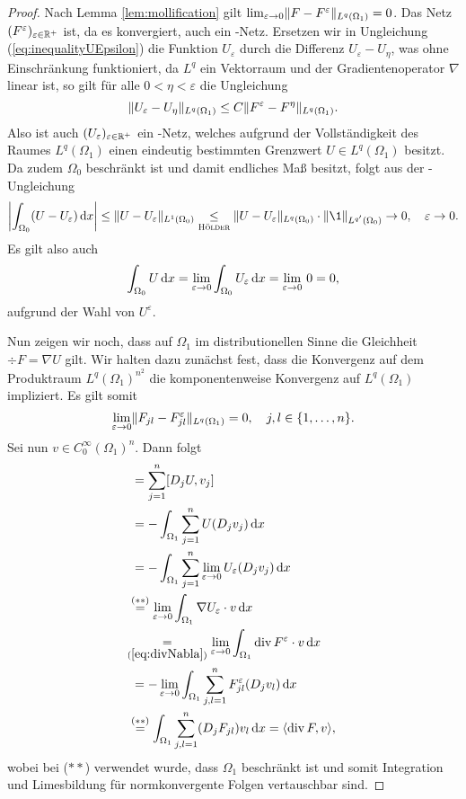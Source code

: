 \begin{proof}
  Nach Lemma \ref{lem:mollification} gilt $\lim_{\varepsilon \to 0} \lVert F - F^\varepsilon \rVert_{L^q(\Omega_1)} = 0$.
  Das Netz $(F^\varepsilon)_{\varepsilon \in \mathbb{R}^+}$ ist, da es konvergiert, auch ein \cauchy-Netz.
  Ersetzen wir in Ungleichung (\ref{eq:inequalityUEpsilon}) die Funktion $U_\varepsilon$ durch die Differenz $U_\varepsilon - U_\eta$, was ohne Einschränkung funktioniert, da $L^q$ ein Vektorraum und der Gradientenoperator $\nabla$ linear ist, so gilt für alle $0 < \eta < \varepsilon$ die Ungleichung
  $$
    \lVert U_\varepsilon - U_\eta \rVert_{L^q(\Omega_1)}
    \leq C \lVert F^\varepsilon - F^\eta \rVert_{L^q(\Omega_1)}.
  $$
  Also ist auch $(U_\varepsilon)_{\varepsilon \in \mathbb{R}^+}$ ein \cauchy-Netz, welches aufgrund der Vollständigkeit des Raumes $L^q(\Omega_1)$ einen eindeutig bestimmten Grenzwert $U \in L^q(\Omega_1)$ besitzt.
  Da zudem $\Omega_0$ beschränkt ist und damit endliches Maß besitzt, folgt aus der \hoelder\hyp{}Ungleichung
  $$
    \left| \int_{\Omega_0} (U - U_\varepsilon) \d x \right|
    \leq  \norm{U - U_\varepsilon}_{L^1(\Omega_0)} 
    \underset{\hoelder}{\leq} \norm{U - U_\varepsilon}_{L^q(\Omega_0)}\cdot \norm{\1}_{L^{q'}(\Omega_0)}
    \to 0, \quad \varepsilon \to 0.
  $$
  Es gilt also auch
  $$
  \int_{\Omega_0} U \, {\operatorname{d}\!{x}} 
  = \lim_{\varepsilon \to 0} \int_{\Omega_0} U_\varepsilon \, {\operatorname{d}\!{x}} 
  = \lim_{\varepsilon \to 0}\, 0 =  0,
  $$
  aufgrund der Wahl von $U^\varepsilon$.

  Nun zeigen wir noch, dass auf $\Omega_1$ im distributionellen Sinne die Gleichheit $\div F = \nabla U$ gilt. 
  Wir halten dazu zunächst fest, dass die Konvergenz auf dem Produktraum $L^q(\Omega_1)^{n^2}$ die komponentenweise Konvergenz auf $L^q(\Omega_1)$ impliziert.
  Es gilt somit 
  $$
  \lim_{\varepsilon \to 0} \lVert F_{jl} - F_{jl}^\varepsilon \rVert_{L^q(\Omega_1)} = 0, \quad j,l \in \{ 1,\dots,n\}. 
  $$ 
  \newpage
  Sei nun $v \in C_0^\infty(\Omega_1)^n$.
  Dann folgt
  \begin{align*}
    [\nabla U, v]
    &= \sum_{j = 1}^n [D_jU, v_j]\\
    &= -\int_{\Omega_1} \sum_{j = 1}^n U (D_j v_j) \d x \\ 
    &= -\int_{\Omega_1} \sum_{j = 1}^n \lim_{\varepsilon \to 0} U_\varepsilon (D_j v_j) \d x \\
    &\hspace{-0.10cm}\overset{(\ast\ast)}{=} \lim_{\varepsilon \to 0} \int_{\Omega_1} \nabla U_\varepsilon \cdot v \d x \\
    &\hspace{-0.21cm}\underset{(\ref{eq:divNabla})}{=} \lim_{\varepsilon \to 0} \int_{\Omega_1} \div F^\varepsilon \cdot v \d x \\
    &= -\lim_{\varepsilon \to 0} \int_{\Omega_1} \sum_{j,l=1}^n F_{jl}^\varepsilon (D_j v_l) \d x \\
    &\hspace{-0.10cm}\overset{(\ast\ast)}{=} \int_{\Omega_1} \sum_{j,l=1}^n (D_j F_{jl}) v_l \d x 
    = \langle \div F, v \rangle,
  \end{align*}
  wobei bei ($\ast\ast$) verwendet wurde, dass $\Omega_1$ beschränkt ist und somit Integration und Limesbildung für normkonvergente Folgen vertauschbar sind.


\end{proof}

